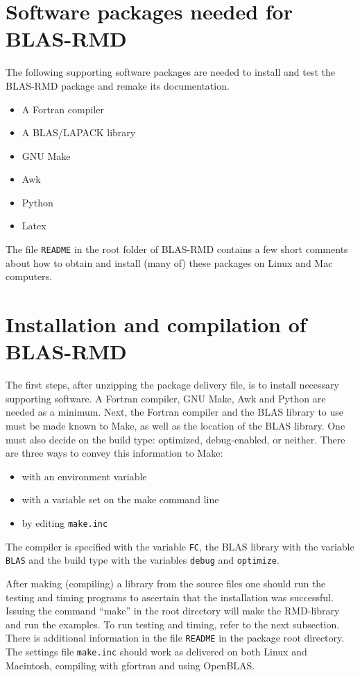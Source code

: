 \documentclass[a4paper]{article}
\begin{document}
\section{Software packages needed for BLAS-RMD}
The following supporting software packages are needed to install and test the
BLAS-RMD package and remake its documentation.

\begin{itemize}
\item A Fortran compiler
\item A BLAS/LAPACK library
\item GNU Make
\item Awk
\item Python
\item Latex
\end{itemize}

\noindent
The file \texttt{README} in the root folder of BLAS-RMD contains a few short comments
about how to obtain and install (many of) these packages on Linux and Mac computers.

\section{Installation and compilation of BLAS-RMD}

The first steps, after unzipping the package delivery file, is to install
necessary supporting software. A Fortran compiler, GNU Make, Awk and
Python are needed as a minimum. Next, the Fortran compiler and the BLAS library to
use must be made known to Make, as well as the location of the BLAS library. One
must also decide on the build type: optimized, debug-enabled, or neither. There
are three ways to convey this information to Make:

\begin{itemize}
\item with an environment variable
\item with a variable set on the make command line
\item by editing \texttt{make.inc}
\end{itemize}

\noindent
The compiler is specified with the variable \texttt{FC}, the BLAS library with the
variable \texttt{BLAS} and the build type with the variables \texttt{debug} and
\texttt{optimize}.

After making (compiling) a library from the source files one should run the
testing and timing programs to ascertain that the installation was successful.
Issuing the command ``make'' in the root directory will make the RMD-library and
run the examples. To run testing and timing, refer to the next subsection. There
is additional information in the file \texttt{README} in the package root
directory. The settings file \texttt{make.inc} should work as delivered on both
Linux and Macintosh, compiling with gfortran and using OpenBLAS.
\end{document}
